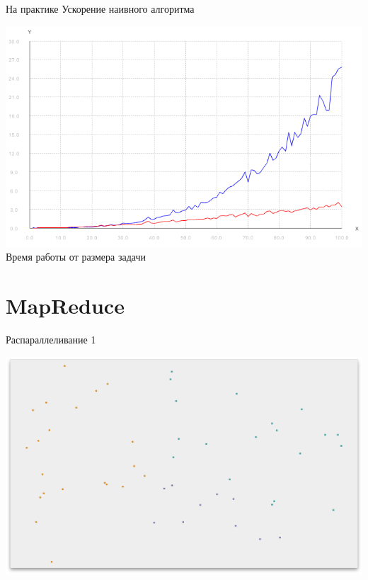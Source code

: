 \documentclass[14pt, fleqn, xcolor={dvipsnames, table}]{beamer}
\begin{document}
        \begin{frame}{На практике}
            Ускорение наивного алгоритма
            \begin{center}
                \includegraphics[scale=0.4]{comparison.png}\\
                Время работы от размера задачи   
            \end{center}  
                  
        \end{frame}
        
    \section{MapReduce}
        
        \begin{frame}{Распараллеливание 1}
            \begin{center}
                \includegraphics[scale=0.295]{4.png}
            \end{center}             
        \end{frame}
        
\end{document}
